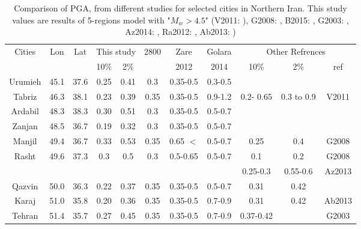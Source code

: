 \begin{table}[!ht]
\centering
\caption{Comparison of PGA, from different studies for selected cities in Northern Iran. This study values are results of 5-regions model with "$M_w > 4.5$" (V2011:  \citet{Vafaie2011}), G2008: \citet{Ghodrati2008}, B2015: \citet{Boostan2015},  G2003:  \citet{Ghodrati2003},  Az2014: \citet{Abdollahzadeh2014a} , Ra2012: \citet{Rahgozar2012} , Ab2013: \citet{Abdi2013} ) }
\begin{tabular}{ | c | c | c | c | c | c | c | c | c | c | c |}


\hline

	
	\multirow{2}{*}{Cities} & \multirow{2}{*}{Lon} & \multirow{2}{*}{Lat} & \multicolumn{2}{|c|}{This study} & \multirow{2}{*}{2800} & Zare & Golara &\multicolumn{3}{|c|}{Other Refrences}    \\ 
	\cline{4-5}  \cline{9-11}  &  &  & 10\% & 2\% &  &  2012 & 2014 & 10\% & 2\% & ref \\ \hline
	 Urumieh   & 45.1   & 37.6    & 0.25 & 0.41   & 0.3 & 0.35-0.5 & 0.3-0.5 &  &  &  \\ \hline
	 Tabriz       & 46.3    & 38.1   & 0.23 & 0.39   & 0.35 & 0.35-0.5 & 0.9-1.2& 0.2- 0.65 & 0.3 to 0.9 & V2011 \\ \hline
	 Ardabil      & 48.3   & 38.3   & 0.30 & 0.51    & 0.3 & 0.35-0.5 &0.5-0.7  &&  &  \\ \hline
	 Zanjan      & 48.5   & 36.7   & 0.19 & 0.32    & 0.3 & 0.35-0.5 &0.5-0.7  &&  &  \\ \hline
	 Manjil       & 49.4   & 36.7    & 0.33 & 0.53   & 0.35 & 0.65 $<$ &0.5-0.7& 0.25 & 0.4 & G2008 \\ \hline
	  \multirow{2}{*}{Rasht}  & \multirow{2}{*}{49.6} & \multirow{2}{*}{37.3} & \multirow{2}{*}{0.3} & \multirow{2}{*}{0.5} & \multirow{2}{*}{0.3} & \multirow{2}{*}{0.5-0.65} & \multirow{2}{*}{0.5-0.7} & 0.1 &  0.2 &  G2008 \\ 
	  \cline{9-11}	             &  &  &  &  &  &  & & 0.25-0.3 & 0.55-0.6 & Az2013\\ \hline
	 Qazvin     & 50.0   & 36.3    & 0.22 & 0.37   & 0.35 & 0.35-0.5 &0.5-0.7& 0.31 & 0.42 &  \\ \hline
	 Karaj        & 51.0   & 35.8    & 0.20 & 0.36   & 0.35 & 0.35-0.5 &0.7-0.9& 0.31 & 0.42 & Ab2013 \\ \hline
	 \multirow{3}{*}{Tehran}  & \multirow{3}{*}{51.4} & \multirow{3}{*}{35.7} & \multirow{3}{*}{0.27} & \multirow{3}{*}{0.45} & \multirow{3}{*}{0.35} & \multirow{3}{*}{0.35-0.5} & \multirow{3}{*}{0.7-0.9} & 0.37-0.42 &  &  G2003 \\ 

\end{tabular}
\end{table}
